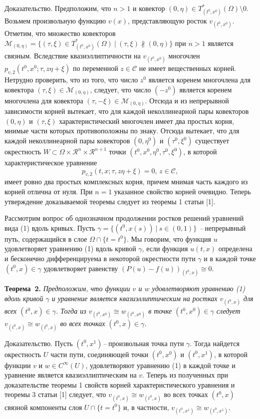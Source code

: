 Доказательство. Предположим, что $n>1$ и ковектор $(0,\eta)\in T^{\ast}_{(t^0,x^0)}(\Omega)\setminus 0$. Возьмем произвольную функцию $v(x)$,   представляющую росток $v_{(t^0,x^0)}$. Отметим, что
множество ковекторов
${\mathcal M}_{(0,\eta)}=\{(\tau,\xi)\in T^{\ast}_{(t^0,x^0)}(\Omega)~|~
(\tau,\xi) \not\parallel  (0,\eta)\}$ при $n>1$ является связным. Вследствие квазиэллиптичности на  $v_{(t^0,x^0)}$
 многочлен $p_{v,2}(t^0,x^0;\tau,z\eta+\xi)$ по переменной $z\in {\mathcal C}$ не имеет вещественных корней. Нетрудно проверить, что из того, что
число $z^0$ является коренем многочлена для ковектора $(\tau,\xi)\in {\mathcal M}_{(0,\eta)}$, следует, что число $(-z^0)$ является  коренем многочлена для  ковектора $(\tau,-\xi)\in {\mathcal M}_{(0,\eta)}$. Отсюда и из непрерывной зависимости корней вытекает, что для каждой неколлинеарной пары ковекторов
$(0,\eta)$ и $(\tau,\xi)$ характеристический многочлен имеет два простых корня, мнимые части которых противоположны по знаку. Отсюда вытекает, что для каждой неколлинеарной пары ковекторов $(0,\eta^0)$ и $(\tau^0,\xi^0)$ существует окрестность $W\subset \Omega\times{\mathcal R}^n\times{\mathcal R}^{n+1}$ точки $(t^0,x^0,\eta^0,\tau^0,\xi^0)$, в которой характеристическое уравнение
$$
p_{v,2}(t,x;\tau,z\eta+\xi)=0,\,z\in{\mathcal C},
$$
имеет ровно два простых комплексных корня, причем мнимая часть каждого из корней отлична от нуля. При $n=1$ указанное свойство корней очевидно. Теперь утверждение доказываемой теоремы следует из теоремы 1 статьи [1].

Рассмотрим вопрос об однозначном продолжении ростков решений уравнений вида (1) вдоль кривых.
Пусть $\gamma=\{(t^0,x(s))~|~s\in(0,1)\}$ \,--\,непрерывный путь, содержащийся в слое $\Omega\cap\{t=t^0\}$.  Мы говорим, что функция $u$ удовлетворяет уравнению (1) вдоль кривой $\gamma$, если функция $u(t,x)$ определена и бесконечно дифференцируема в некоторой окрестности пути $\gamma$  и в каждой точке $(t^0,x)\in\gamma$ удовлетворяет равенству $(P(u)-f(u))_{(t^0,x)}\cong 0$.

\textbf{Теорема~2.} {\it
Предположим, что функции $v$ и $w$ удовлетворяют уравнению {\rm (1)} вдоль кривой $\gamma$ и уравнение
является квазиэллиптическим на ростках  $v_{(t^0,x)}$ для всех $(t^0,x)\in\gamma$. Тогда из $v_{(t^0,x^0)}\cong w_{(t^0,x^0)}$ в точке
$(t^0,x^0)\in\gamma$ следует $v_{(t^0,x)}\cong w_{(t^0,x)}$ во всех точках
$(t^0,x)\in\gamma$.
}

Доказательство. Пусть $(t^0,x^1)$\,--\,произвольная точка пути $\gamma$. Тогда
найдется окрестность $U$ части пути, соединяющей точки  $(t^0,x^0)$ и  $(t^0,x^1)$, в которой функции $v$ и $w\in C^{\infty}(U)$, удовлетворяют уравнению (1) в каждой точке и уравнение является квазиэллиптическим на $v$.
Теперь  из полученных при доказательстве теоремы 1 свойств корней характеристического уравнения и теоремы 3 статьи [1] следует, что $v_{(t^0,x)}\cong w_{(t^0,x)}$ во всех точках $(t^0,x)$ связной компоненты слоя $U\cap\{t=t^0\}$ и, в частности, $v_{(t^0,x^1)}\cong w_{(t^0,x^1)}$.



